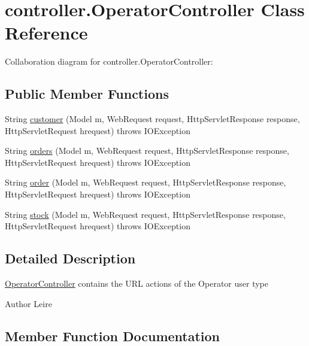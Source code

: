 \hypertarget{classcontroller_1_1_operator_controller}{}\section{controller.\+Operator\+Controller Class Reference}
\label{classcontroller_1_1_operator_controller}


Collaboration diagram for controller.\+Operator\+Controller\+:
\subsection*{Public Member Functions}
\begin{DoxyCompactItemize}
\item 
String \mbox{\hyperlink{classcontroller_1_1_operator_controller_af4c2983ca84d7115743de160da84135c}{customer}} (Model m, Web\+Request request, Http\+Servlet\+Response response, Http\+Servlet\+Request hrequest)  throws I\+O\+Exception 
\item 
String \mbox{\hyperlink{classcontroller_1_1_operator_controller_a79b22da6d85dc475cd7973d4f9a47fc1}{orders}} (Model m, Web\+Request request, Http\+Servlet\+Response response, Http\+Servlet\+Request hrequest)  throws I\+O\+Exception 
\item 
String \mbox{\hyperlink{classcontroller_1_1_operator_controller_a1fcb7b5bea154a09eef4db21632bcc60}{order}} (Model m, Web\+Request request, Http\+Servlet\+Response response, Http\+Servlet\+Request hrequest)  throws I\+O\+Exception 
\item 
String \mbox{\hyperlink{classcontroller_1_1_operator_controller_a20f145b080521609c4513dc5544612a2}{stock}} (Model m, Web\+Request request, Http\+Servlet\+Response response, Http\+Servlet\+Request hrequest)  throws I\+O\+Exception 
\end{DoxyCompactItemize}


\subsection{Detailed Description}
\mbox{\hyperlink{classcontroller_1_1_operator_controller}{Operator\+Controller}} contains the U\+RL actions of the Operator user type \begin{DoxyAuthor}{Author}
Leire 
\end{DoxyAuthor}


\subsection{Member Function Documentation}
\mbox{\label{classcontroller_1_1_operator_controller_af4c2983ca84d7115743de160da84135c}} 
